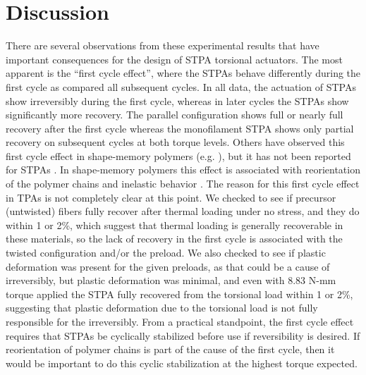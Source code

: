 \documentclass[twocolumn,10pt]{asme2e}
\begin{document}
\section{Discussion}

There are several observations from these experimental results that have important consequences for the design of STPA torsional actuators.  The most apparent is the ``first cycle effect'', where the STPAs behave differently during the first cycle as compared all subsequent cycles.  In all data, the actuation of STPAs show irreversibly during the first cycle,  whereas in later cycles the STPAs show significantly more recovery.  The parallel configuration shows full or nearly full recovery after the first cycle whereas the monofilament STPA shows only partial recovery on subsequent cycles at both torque levels.  %
Others have observed this first cycle effect in shape-memory polymers (e.g. \cite{Lendlein_Biodegradable}), but it has not been reported for STPAs \cite{Aziz_Controlled}.  In shape-memory polymers this effect is associated with reorientation of the polymer chains and inelastic behavior \cite{Lendlein_Biodegradable}.
The reason for this first cycle effect in TPAs is not completely clear at this point.  We checked to see if precursor (untwisted) fibers fully recover after thermal loading under no stress, and they do within 1 or 2\%, which suggest that thermal loading is generally recoverable in these materials, so the lack of recovery in the first cycle is associated with the twisted configuration and/or the preload.  We also checked to see if plastic deformation was present for the given preloads, as that could be a cause of irreversibly, but plastic deformation was minimal, and even with 8.83 N-mm torque applied the STPA fully recovered from the torsional load within 1 or 2\%, suggesting that plastic deformation due to the torsional load is not fully responsible for the irreversibly.  From a practical standpoint, the first cycle effect requires that STPAs be cyclically stabilized before use if reversibility is desired.  If reorientation of polymer chains is part of the cause of the first cycle, then it would be important to do this cyclic stabilization at the highest torque expected.  
\end{document}

